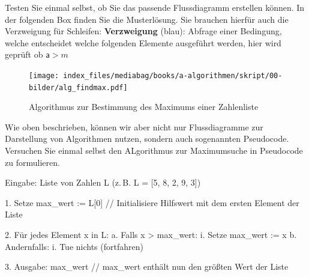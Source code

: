\documentclass[
  letterpaper,
  DIV=11,
  numbers=noendperiod]{scrreprt}
\newenvironment{Shaded}{\begin{snugshade}}{\end{snugshade}}
\newcommand{\NormalTok}[1]{\textcolor[rgb]{0.00,0.23,0.31}{#1}}
\begin{document}
Testen Sie einmal selbst, ob Sie das passende Flussdiagramm erstellen
können. In der folgenden Box finden Sie die Musterlösung. Sie brauchen
hierfür auch die Verzweigung für Schleifen: \textbf{Verzweigung} (blau):
Abfrage einer Bedingung, welche entscheidet welche folgenden Elemente
ausgeführt werden, hier wird geprüft ob \(\mathsf a > m\)

\begin{tcolorbox}[enhanced jigsaw, bottomtitle=1mm, colbacktitle=quarto-callout-caution-color!10!white, colback=white, opacityback=0, arc=.35mm, left=2mm, toprule=.15mm, title=\textcolor{quarto-callout-caution-color}{\faFire}\hspace{0.5em}{Flussdiagramm: Maximumsuche}, coltitle=black, toptitle=1mm, leftrule=.75mm, opacitybacktitle=0.6, breakable, titlerule=0mm, rightrule=.15mm, bottomrule=.15mm, colframe=quarto-callout-caution-color-frame]

\begin{figure}[H]

{\centering \texttt{[image: index\_files/mediabag/books/a-algorithmen/skript/00-bilder/alg\_findmax.pdf]}

}

\caption{Algorithmus zur Bestimmung des Maximums einer Zahlenliste}

\end{figure}%

\end{tcolorbox}

Wie oben beschrieben, können wir aber nicht nur Flussdiagramme zur
Darstellung von Algorithmen nutzen, sondern auch sogenannten Pseudocode.
Versuchen Sie einmal selbst den ALgorithmus zur Maximumsuche in
Pseudocode zu formulieren.

\begin{tcolorbox}[enhanced jigsaw, bottomtitle=1mm, colbacktitle=quarto-callout-caution-color!10!white, colback=white, opacityback=0, arc=.35mm, left=2mm, toprule=.15mm, title=\textcolor{quarto-callout-caution-color}{\faFire}\hspace{0.5em}{Pseudocode: Maximumsuche}, coltitle=black, toptitle=1mm, leftrule=.75mm, opacitybacktitle=0.6, breakable, titlerule=0mm, rightrule=.15mm, bottomrule=.15mm, colframe=quarto-callout-caution-color-frame]

\begin{Shaded}
\begin{Highlighting}[]
\NormalTok{Eingabe: Liste von Zahlen L (z. B. L = [5, 8, 2, 9, 3])}

\NormalTok{1. Setze max\_wert := L[0]        // Initialisiere Hilfswert mit dem ersten Element der Liste}

\NormalTok{2. Für jedes Element x in L:}
\NormalTok{    a. Falls x \textgreater{} max\_wert:}
\NormalTok{        i. Setze max\_wert := x}
\NormalTok{    b. Andernfalls:}
\NormalTok{        i. Tue nichts (fortfahren)}

\NormalTok{3. Ausgabe: max\_wert             // max\_wert enthält nun den größten Wert der Liste}
\end{Highlighting}
\end{Shaded}

\end{tcolorbox}
\end{document}
